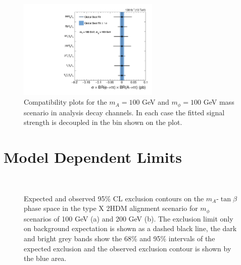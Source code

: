 \begin{figure}[!hbtp]
\centering
    \includegraphics[width=0.6\textwidth]{Figures/ChannelCompatibilityCheck_FitResults_mphi100mA100_channel.pdf}
\caption{Compatibility plots for the $m_{A}=100$ GeV and $m_{\phi}=100$ GeV mass scenario in analysis decay channels. In each case the fitted signal strength is decoupled in the bin shown on the plot.}
\label{fig:4tau_ccc}
\end{figure}

\section{Model Dependent Limits}

\begin{figure}[!hbtp]
\centering
     \\
\caption{Expected and observed 95\% CL exclusion contours on the $m_{A}$-$\tan\beta$ phase space in the type X 2HDM alignment scenario for $m_{\phi}$ scenarios of 100 GeV (a) and 200 GeV (b). The exclusion limit only on background expectation is shown as a dashed black line, the dark and bright grey bands show the 68\% and 95\% intervals of the expected exclusion and the observed exclusion contour is shown by the blue area.}
\label{fig:4tau_md}
\end{figure}

